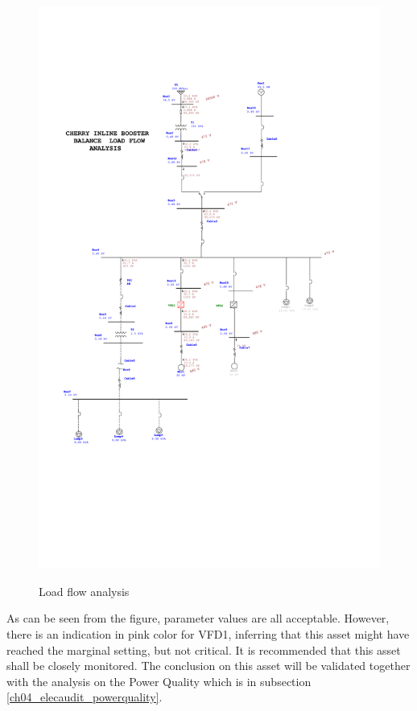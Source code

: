 \begin{figure}[!htb]
	\includegraphics[width=\textwidth]{figures/CHE_bal_load_flow_with_vfd.pdf} \\
	\caption{Load flow analysis}
	\label{CHE_bal_load_flow_with_vfd} 
\end{figure}

As can be seen from the figure, parameter values are all acceptable. However, there is an indication in pink color for VFD1, inferring that this asset might have reached the marginal setting, but not critical. It is recommended that this asset shall be closely monitored. The conclusion on this asset will be validated together with the analysis on the Power Quality which is in subsection \ref{ch04_elecaudit_powerquality}.

